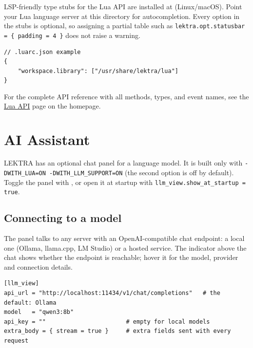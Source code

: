 \documentclass[a4paper,12pt]{article}
\newcommand{\pathtt}[1]{{\ttfamily\seqsplit{#1}}}
\begin{document}
LSP-friendly type stubs for the Lua API are installed at
\pathtt{\$prefix/share/lektra/lua/} (Linux/macOS). Point your Lua language server at this directory for autocompletion. Every option in the stubs is optional, so assigning a partial table such as \texttt{lektra.opt.statusbar = \{ padding = 4 \}} does not raise a warning.

\begin{tcolorbox}[colback=gray!5, colframe=gray!40, boxrule=0.4pt, arc=4pt,
    fontupper=\ttfamily\small]
\begin{verbatim}
// .luarc.json example
{
    "workspace.library": ["/usr/share/lektra/lua"]
}
\end{verbatim}
\end{tcolorbox}

For the complete API reference with all methods, types, and event names, see the \href{https://lektra.readthedocs.io/en/latest/reference/lua_api/}{Lua API} page on the homepage.

\section{AI Assistant}
\label{sec:assistant}

LEKTRA has an optional chat panel for a language model. It is built only with \texttt{-DWITH\_\allowbreak{}LUA=ON -DWITH\_\allowbreak{}LLM\_\allowbreak{}SUPPORT=ON} (the second option is off by default). Toggle the panel with , or open it at startup with \texttt{llm\_\allowbreak{}view.show\_\allowbreak{}at\_\allowbreak{}startup = true}.

\subsection{Connecting to a model}

The panel talks to any server with an OpenAI-compatible chat endpoint: a local one (Ollama, llama.cpp, LM Studio) or a hosted service. The indicator above the chat shows whether the endpoint is reachable; hover it for the model, provider and connection details.

\begin{tcolorbox}[colback=gray!5, colframe=gray!40, boxrule=0.4pt, arc=4pt,
    fontupper=\ttfamily\small]
\begin{verbatim}
[llm_view]
api_url = "http://localhost:11434/v1/chat/completions"   # the default: Ollama
model   = "qwen3:8b"
api_key = ""                       # empty for local models
extra_body = { stream = true }     # extra fields sent with every request
\end{verbatim}
\end{tcolorbox}
\end{document}

